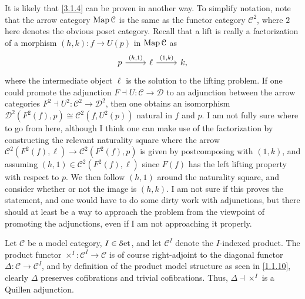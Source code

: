 \begin{remark}\label{3.1.7}
	It is likely that \cref{3.1.4} can be proven in another way. To simplify notation, note that the arrow category $\operatorname{Map} \mathcal{C} $ is the same as the functor category $\mathcal{C} ^2$, where $2$ here denotes the obvious poset category. Recall that a lift is really a factorization of a morphism $(h,k): f \to U(p)$ in $\operatorname{Map} \mathcal{C} $ as
	\[\begin{tikzcd}[row sep = 2.5em, column sep = 2.5em]
	p \ar[" (h\text{,} 1) ", r]  & \ell \ar[" (1\text{,} k) ", r]  & k,
	\end{tikzcd}\]
	where the intermediate object $\ell $ is the solution to the lifting problem. If one could promote the adjunction $F\dashv U : \mathcal{C}  \to \mathcal{D} $ to an adjunction between the arrow categories $F^2 \dashv U^2 : \mathcal{C}^2 \to \mathcal{D}^2$, then one obtains an isomorphism $\mathcal{D}^2 (F^2(f), p)\cong \mathcal{C} ^2(f,U^2(p))$ natural in $f$ and $p$. I am not fully sure where to go from here, although I think one can make use of the factorization by constructing the relevant naturality square where the arrow $\mathcal{C} ^2(F^2(f),\ell )\to \mathcal{C} ^2(F^2(f),p)$ is given by postcomposing with $(1,k)$, and assuming $(h,1)\in \mathcal{C} ^2(F^2(f),\ell )$ since $F(f)$ has the left lifting property with respect to $p$. We then follow $(h,1)$ around the naturality square, and consider whether or not the image is $(h,k)$. I am not sure if this proves the statement, and one would have to do some dirty work with adjunctions, but there should at least be a way to approach the problem from the viewpoint of promoting the adjunctions, even if I am not approaching it properly.
\end{remark}


\begin{example}\label{3.1.8}
	Let $\mathcal{C} $ be a model category, $I\in \mathcal{S}\mathrm{et} $, and let $\mathcal{C} ^I$ denote the $I$-indexed product. The product functor $\times ^I : \mathcal{C} ^I\to \mathcal{C} $ is of course right-adjoint to the diagonal functor $\Delta:\mathcal{C} \to \mathcal{C} ^I$, and by definition of the product model structure as seen in \cref{1.1.10}, clearly $\Delta$ preserves cofibrations and trivial cofibrations. Thus, $\Delta\dashv\times^I $ is a Quillen adjunction.
\end{example}

